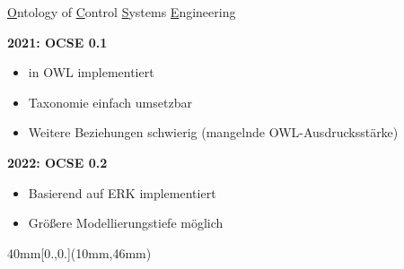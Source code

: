 \documentclass[
	ngerman,
	10pt,				%
	aspectratio=169 	%
]{beamer}
\begin{document}

  
\begin{frame}[fragile,label=ocse1]{\large \underline{O}ntology of \underline{C}ontrol \underline{S}ystems \underline{E}ngineering}

\textbf{2021: OCSE 0.1}
\begin{itemize}
 \item in OWL implementiert
 \item Taxonomie einfach umsetzbar
 \item Weitere Beziehungen schwierig  (mangelnde OWL-Ausdrucksstärke)
\end{itemize}

\pause
\bigskip
\textbf{2022: OCSE 0.2}
\begin{itemize}
 \item Basierend auf ERK implementiert
 \item Größere Modellierungstiefe möglich
\end{itemize}


\begin{textblock*}{40mm}[0.,0.](10mm,46mm)
\end{textblock*}

\end{frame}
  
\end{document}
